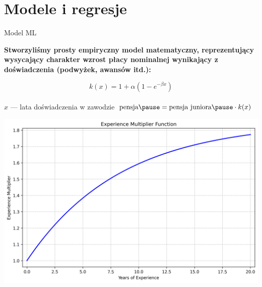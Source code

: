 \section{Modele i regresje}


\begin{frame}[t]{Model ML}

    \textbf{Stworzyliśmy prosty empiryczny model matematyczny,
        reprezentujący wysycający charakter wzrost płacy nominalnej wynikający z doświadczenia
        (podwyżek, awansów itd.):}

    \pause

    \begin{equation}
    k(x) = 1 + \alpha (1 - e^{-\beta x})
    \end{equation}
    \pause
    \\[.5cm]
    \centering
    $x$ --- lata doświadczenia w zawodzie
    \pause
    $\textrm{pensja} \pause = \textrm{pensja juniora} \pause \cdot k(x)$
\end{frame}

\begin{frame}[plain]
    \includegraphics[width=.8\textwidth]{img/experience_multiplier}
\end{frame}

